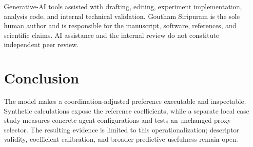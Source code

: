 \documentclass[11pt]{article}
\begin{document}
Generative-AI tools assisted with drafting, editing, experiment implementation, analysis code, and internal technical validation. Goutham Siripuram is the sole human author and is responsible for the manuscript, software, references, and scientific claims. AI assistance and the internal review do not constitute independent peer review.

\section{Conclusion}
The model makes a coordination-adjusted preference executable and inspectable. Synthetic calculations expose the reference coefficients, while a separate local case study measures concrete agent configurations and tests an unchanged proxy selector. The resulting evidence is limited to this operationalization; descriptor validity, coefficient calibration, and broader predictive usefulness remain open.
\begingroup\small\sloppy\endgroup
\end{document}
